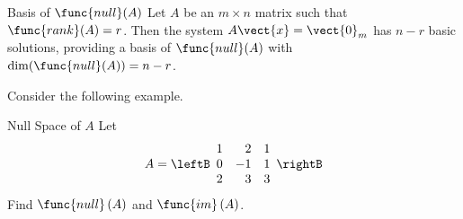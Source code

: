 \begin{theorem}{Basis of $\func{null}(A)$}\label{thm:nullspacebasis}
Let $A$ be an $m \times n$ matrix such that $\func{rank}(A) = r$. Then the system $A\vect{x}=\vect{0}_m$ has $n-r$ basic solutions, providing a basis of $\func{null}(A)$ with $\dim(\func{null}(A))=n-r$.
\end{theorem}

Consider the following example. 

\begin{example}{Null Space of $A$}\label{exa:nullspace}
Let
\begin{equation*}
A=\leftB
\begin{array}{rrr}
1 & 2 & 1 \\
0 & -1 & 1 \\
2 & 3 & 3
\end{array}
\rightB 
\end{equation*}
Find $\func{null} \left( A\right) $ and $\func{im}\left( A\right)$.
\end{example}

